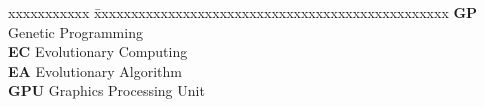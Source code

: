 \abbreviations
 
\noindent 
\begin{tabbing}
xxxxxxxxxxx \= xxxxxxxxxxxxxxxxxxxxxxxxxxxxxxxxxxxxxxxxxxxxxxxx \kill
\textbf{GP}   \> Genetic Programming \\
\textbf{EC}   \> Evolutionary Computing \\
\textbf{EA}   \> Evolutionary Algorithm \\
\textbf{GPU}  \> Graphics Processing Unit \\
\end{tabbing}

